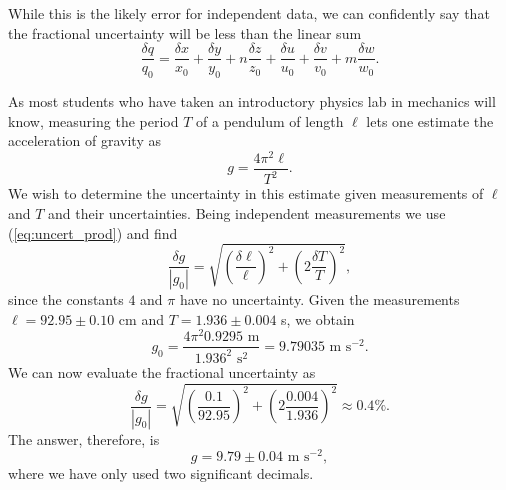 While this is the likely error for independent data, we can confidently say that the fractional 
uncertainty will be less than the linear sum
\begin{equation}
\frac{\delta q}{q_0} = \frac{\delta x}{x_0} + \frac{\delta y }{y_0} +
n  \frac{\delta z}{z_0} +  \frac{\delta u}{u_0} +  \frac{\delta v}{v_0} +
m  \frac{\delta w}{w_0}.
\end{equation}
\begin{example}
As most students who have taken an introductory physics lab in mechanics will know, measuring
the period $T$ of a pendulum of length $\ell$ lets one estimate the 
acceleration of gravity as 
\begin{equation}
g = \frac{4\pi^2 \ell}{T^2}.
\end{equation}	 
We wish to determine the uncertainty in this estimate given measurements of $\ell$ and $T$
and their uncertainties.  Being independent measurements we use (\ref{eq:uncert_prod}) and find
\begin{equation}
\frac{\delta g}{\left| g_0    \right |} = 
\sqrt{ \left( \frac{\delta \ell}{\ell}   \right)^2 + \left( 2 \frac{\delta T}{T}   \right)^2      },
\end{equation}	 
since the constants $4$ and $\pi $ have no uncertainty.  Given the measurements
$\ell  = 92.95 \pm 0.10$ cm and $T = 1.936 \pm 0.004$ s, we obtain
\begin{equation}
g_0 = \frac{4 \pi^2 0.9295\mbox{ m}}{1.936^2\mbox{ s}^2} = 9.79035 \mbox{ m s}^{-2}.
\end{equation}	 
We can now evaluate the fractional uncertainty as     
\begin{equation}
\frac{\delta g}{\left| g_0    \right |} = 
\sqrt{ \left( \frac{0.1}{92.95}   \right)^2 + \left( 2 \frac{0.004}{1.936}   \right)^2 } \approx 0.4\%.
\end{equation}	 
The answer, therefore, is
\begin{equation}
g = 9.79 \pm 0.04 \mbox{ m s}^{-2},
\end{equation}
where we have only used two significant decimals.
\end{example}


